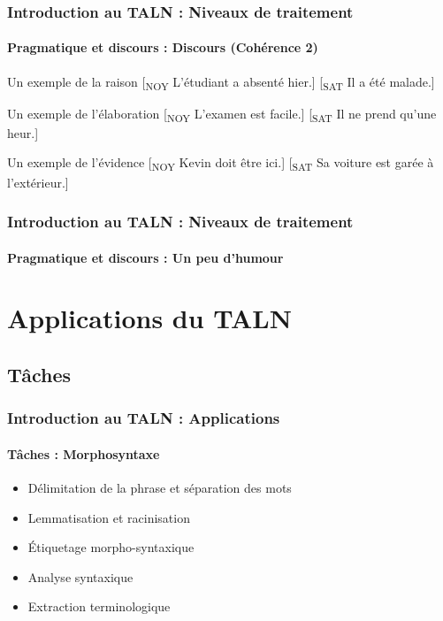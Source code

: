 \documentclass[xcolor=table]{beamer}
\begin{document}
\begin{frame}
\frametitle{Introduction au TALN : Niveaux de traitement}
\framesubtitle{Pragmatique et discours : Discours (Cohérence 2)}

\begin{exampleblock}{Un exemple de la raison}
	[\textsubscript{NOY} L'étudiant a absenté hier.] [\textsubscript{SAT} Il a été malade.]
\end{exampleblock}

\begin{exampleblock}{Un exemple de l'élaboration}
	[\textsubscript{NOY} L'examen est facile.] [\textsubscript{SAT} Il ne prend qu'une heur.]
\end{exampleblock}

\begin{exampleblock}{Un exemple de l'évidence}
	[\textsubscript{NOY} Kevin doit être ici.] [\textsubscript{SAT} Sa voiture est garée à l'extérieur.]
\end{exampleblock}


\end{frame}

\begin{frame}
\frametitle{Introduction au TALN : Niveaux de traitement}
\framesubtitle{Pragmatique et discours : Un peu d'humour}

\begin{center}
\end{center}

\end{frame}

\section{Applications du TALN}

%

\subsection{Tâches}

\begin{frame}
\frametitle{Introduction au TALN : Applications}
\framesubtitle{Tâches : Morphosyntaxe}

\begin{itemize}
	\item Délimitation de la phrase et séparation des mots 
	\item Lemmatisation et racinisation
	\item Étiquetage morpho-syntaxique
	\item Analyse syntaxique
	\item Extraction terminologique
\end{itemize}

\end{frame}
\end{document}
